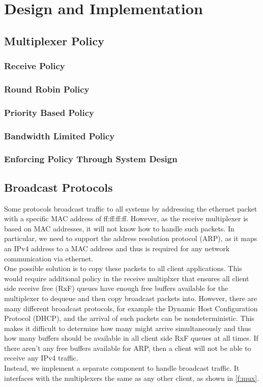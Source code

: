 \chapter{Design and Implementation}\label{ch:design}

\section{Multiplexer Policy}

\subsection{Receive Policy}

\subsection{Round Robin Policy}

\subsection{Priority Based Policy}

\subsection{Bandwidth Limited Policy}

\subsection{Enforcing Policy Through System Design}


\section{Broadcast Protocols}
Some protocols broadcast traffic to all systems by addressing the
ethernet packet with a specific MAC address of ff:ff:ff:ff. However,
as the receive multiplexer is based on MAC addresses, it will not
know how to handle such packets. In particular, we need to support 
the address resolution protocol (ARP), as it maps an
IPv4 address to a MAC address and thus 
is required for any network communication via ethernet.\\
One possible solution is to copy these packets to all client applications.
This would require additional policy in the receive multiplxer that ensures
all client side receive free (RxF) queues have enough free buffers available
for the multiplexer to dequeue and then copy broadcast packets into.
However, there are many different broadcast protocols, for example the Dynamic
Host Configuration Protocol (DHCP), and the arrival of such packets
can be nondeterministic. This makes it difficult to determine how many might arrive
simultaneously and thus how many buffers should be available in all client side
RxF queues at all times. If there aren't any free buffers available for ARP, then
a client will not be able to receive any IPv4 traffic.\\
Instead, we implement a separate component to handle broadcast traffic. It interfaces
with the multiplexers the same as any other client, as shown in \autoref{f:mux}. 

